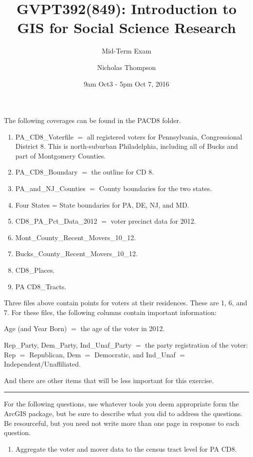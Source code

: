 \documentclass[]{article}
\title{GVPT392(849): Introduction to GIS for Social Science Research}
\subtitle{Mid-Term Exam}
\author{Nicholas Thompson}
\date{9am Oct3 - 5pm Oct 7, 2016}
\providecommand{\tightlist}{%
  \setlength{\itemsep}{0pt}\setlength{\parskip}{0pt}}
\begin{document}
\maketitle

The following coverages can be found in the PACD8 folder.

\begin{enumerate}
\def\labelenumi{\arabic{enumi}.}
\item
  PA\_CD8\_Voterfile \(=\) all registered voters for Pennsylvania,
  Congressional District 8. This is north-suburban Philadelphia,
  including all of Bucks and part of Montgomery Counties.
\item
  PA\_CD8\_Boundary \(=\) the outline for CD 8.
\item
  PA\_and\_NJ\_Counties \(=\) County boundaries for the two states.
\item
  Four States = State boundaries for PA, DE, NJ, and MD.
\item
  CD8\_PA\_Pct\_Data\_2012 \(=\) voter precinct data for 2012.
\item
  Mont\_County\_Recent\_Movers\_10\_12.
\item
  Bucks\_County\_Recent\_Movers\_10\_12.
\item
  CD8\_Places.
\item
  PA CD8\_Tracts.
\end{enumerate}

Three files above contain points for voters at their residences. These
are 1, 6, and 7. For these files, the following columns contain
important information:

Age (and Year Born) \(=\) the age of the voter in 2012.

Rep\_Party, Dem\_Party, Ind\_Unaf\_Party \(=\) the party registration of
the voter: Rep \(=\) Republican, Dem \(=\) Democratic, and Ind\_Unaf
\(=\) Independent/Unaffiliated.

And there are other items that will be less important for this exercise.

\begin{center}\rule{0.5\linewidth}{\linethickness}\end{center}

For the following questions, use whatever tools you deem appropriate
form the ArcGIS package, but be sure to describe what you did to address
the questions. Be resourceful, but you need not write more than one page
in response to each question.

\begin{enumerate}
\def\labelenumi{\arabic{enumi}.}
\tightlist
\item
  Aggregate the voter and mover data to the census tract level for PA
  CD8.
\end{enumerate}
\end{document}

